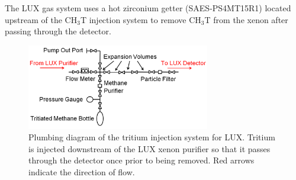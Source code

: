 The LUX gas system uses a hot zirconium getter (SAES-PS4MT15R1) located upstream of the CH$_3$T injection system to remove CH$_3$T from the xenon after passing through the detector.  

\begin{figure}[H]\centering
\includegraphics[width=80mm]{TritiumPlumbing.png}
\caption{Plumbing diagram of the tritium injection system for LUX.  Tritium is injected downstream of the LUX xenon purifier so that it passes through the detector once prior to being removed.  Red arrows indicate the direction of flow.}
\label{fig:Removal}
\end{figure}

